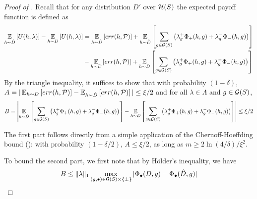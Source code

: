 \begin{proof}[Proof of ]
  Recall that for any distribution $D'$ over $\mathcal{H}(S)$ the expected
  payoff function is defined as
  \begin{align*}
    \operatorname*{\mathbb{E}}_{h\sim \hat D}\left[U(h, \lambda)\right] -  \operatorname*{\mathbb{E}}_{h\sim D}\left[U(h, \lambda)\right] &= \operatorname*{\mathbb{E}}_{h\sim \hat D}\left[err(h, \mathcal{P})\right] 
                                                                      + \operatorname*{\mathbb{E}}_{h\sim \hat D}\left[\sum_{g\in \mathcal{G}(S)}
                                                                      \left(\lambda_g^+\Phi_+(h, g) + \lambda_g^-\Phi_-(h, g) \right)\right]\\
&- \operatorname*{\mathbb{E}}_{h\sim D}\left[err(h, \mathcal{P})\right] 
                                                                      + \operatorname*{\mathbb{E}}_{h\sim D}\left[\sum_{g\in \mathcal{G}(S)}
                                                                      \left(\lambda_g^+\Phi_+(h, g) + \lambda_g^-\Phi_-(h, g) \right)\right]
  \end{align*}
  By the triangle inequality, it suffices to show that with
  probability $(1 - \delta)$,
  $A = |\operatorname*{\mathbb{E}}_{h\sim D}\left[err(h, \mathcal{P})\right] - \operatorname*{\mathbb{E}}_{h\sim \hat D}\left[err(h, \mathcal{P})\right]|
  \leq \xi/2$ and for all $\lambda\in \Lambda$ and $g\in \mathcal{G}(S)$,
  \[
    B = \left| \operatorname*{\mathbb{E}}_{h\sim \hat D}\left[\sum_{g\in \mathcal{G}(S)}
        \left(\lambda_g^+\Phi_+(h, g) + \lambda_g^-\Phi_-(h, g)
        \right)\right] - \operatorname*{\mathbb{E}}_{h\sim D}\left[\sum_{g\in \mathcal{G}(S)}
        \left(\lambda_g^+\Phi_+(h, g) + \lambda_g^-\Phi_-(h, g)
        \right)\right]\right| \leq \xi/2
  \]



    The first part follows directly from a simple application of the
    Chernoff-Hoeffding bound (): with probability
    $(1 - \delta/2)$, $A \leq \xi/2$, as long as
    $m\geq 2\ln(4/\delta)/\xi^2 $.

    To bound the second part, we first note that by H\"{o}lder's
    inequality, we have
    $$B\leq \|\lambda\|_1 \max_{(g, \bullet)\in \mathcal{G}(S) \times
      \{\pm\}}|\Phi_\bullet(D, g) - \Phi_\bullet(\hat D, g)|$$ 


\end{proof}
